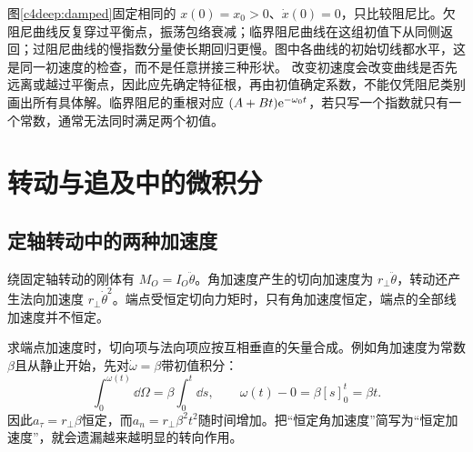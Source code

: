 图\ref{c4deep:damped}固定相同的 $x(0)=x_0>0$、$\dot x(0)=0$，只比较阻尼比。欠阻尼曲线反复穿过平衡点，振荡包络衰减；临界阻尼曲线在这组初值下从同侧返回；过阻尼曲线的慢指数分量使长期回归更慢。图中各曲线的初始切线都水平，这是同一初速度的检查，而不是任意拼接三种形状。
改变初速度会改变曲线是否先远离或越过平衡点，因此应先确定特征根，再由初值确定系数，不能仅凭阻尼类别画出所有具体解。临界阻尼的重根对应 $(A+Bt)\mathrm e^{-\omega_0t}$，若只写一个指数就只有一个常数，通常无法同时满足两个初值。


\section{转动与追及中的微积分}
\subsection{定轴转动中的两种加速度}
绕固定轴转动的刚体有 $M_O=I_O\ddot\theta$。角加速度产生的切向加速度为 $r_\perp\ddot\theta$，转动还产生法向加速度 $r_\perp\dot\theta^2$。端点受恒定切向力矩时，只有角加速度恒定，端点的全部线加速度并不恒定。

求端点加速度时，切向项与法向项应按互相垂直的矢量合成。例如角加速度为常数$\beta$且从静止开始，先对$\dot\omega=\beta$带初值积分：
\[
\int_0^{\omega(t)}\dd\Omega=\beta\int_0^t\dd s,
\qquad\omega(t)-0=\beta[s]_0^t=\beta t.
\]
因此$a_\tau=r_\perp\beta$恒定，而$a_n=r_\perp\beta^2t^2$随时间增加。把“恒定角加速度”简写为“恒定加速度”，就会遗漏越来越明显的转向作用。


